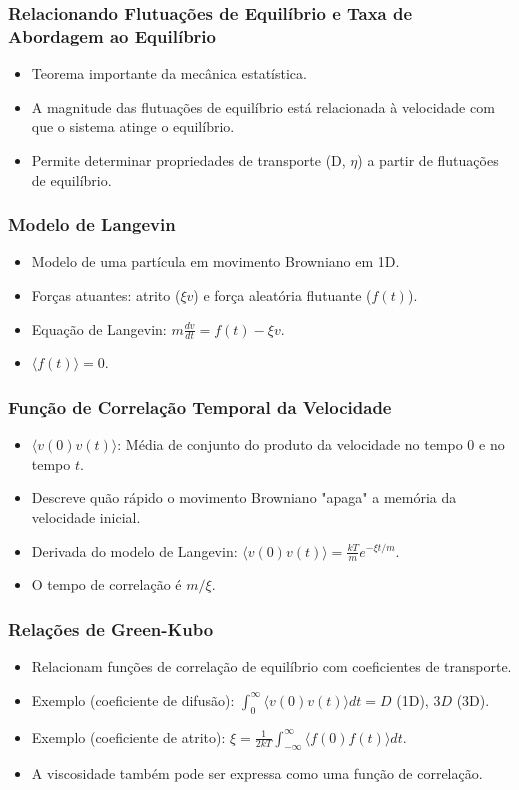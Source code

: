 \documentclass[11pt]{beamer}
\begin{document}
\begin{frame}
    \frametitle{Relacionando Flutuações de Equilíbrio e Taxa de Abordagem ao Equilíbrio}
    \begin{itemize}
        \item Teorema importante da mecânica estatística.
        \item A magnitude das flutuações de equilíbrio está relacionada à velocidade com que o sistema atinge o equilíbrio.
        \item Permite determinar propriedades de transporte (D, $\eta$) a partir de flutuações de equilíbrio.
    \end{itemize}
\end{frame}

\begin{frame}
    \frametitle{Modelo de Langevin}
    \begin{itemize}
        \item Modelo de uma partícula em movimento Browniano em 1D.
        \item Forças atuantes: atrito ($\xi v$) e força aleatória flutuante ($f(t)$).
        \item Equação de Langevin: $m \frac{dv}{dt} = f(t) - \xi v$.
        \item $\langle f(t) \rangle = 0$.
    \end{itemize}
\end{frame}

\begin{frame}
    \frametitle{Função de Correlação Temporal da Velocidade}
    \begin{itemize}
        \item $\langle v(0)v(t) \rangle$: Média de conjunto do produto da velocidade no tempo 0 e no tempo $t$.
        \item Descreve quão rápido o movimento Browniano "apaga" a memória da velocidade inicial.
        \item Derivada do modelo de Langevin: $\langle v(0)v(t) \rangle = \frac{kT}{m} e^{-\xi t/m}$.
        \item O tempo de correlação é $m/\xi$.
    \end{itemize}
\end{frame}

\begin{frame}
    \frametitle{Relações de Green-Kubo}
    \begin{itemize}
        \item Relacionam funções de correlação de equilíbrio com coeficientes de transporte.
        \item Exemplo (coeficiente de difusão): $\int_{0}^{\infty}\langle v(0)v(t)\rangle dt = D$ (1D), $3D$ (3D).
        \item Exemplo (coeficiente de atrito): $\xi = \frac{1}{2kT}\int_{-\infty}^{\infty}\langle f(0)f(t)\rangle dt$.
        \item A viscosidade também pode ser expressa como uma função de correlação.
    \end{itemize}
\end{frame}
\end{document}
